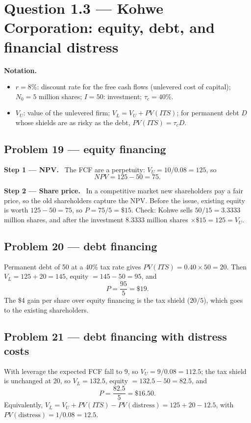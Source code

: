 \documentclass[11pt,a4paper]{article}
\numberwithin{equation}{section}
\newcommand{\statement}[1]{\par\smallskip\noindent\colorbox{black!5}{\parbox{\dimexpr\linewidth-2\fboxsep}{\small #1}}\par\medskip}
\newcommand{\step}[2]{\par\medskip\noindent\textbf{Step #1 --- #2.}~}
\newenvironment{notation}{\par\noindent\textbf{Notation.}\begin{itemize}[leftmargin=1.4em]}{\end{itemize}}
\begin{document}
\section{Question 1.3 --- Kohwe Corporation: equity, debt, and financial distress}

\statement{\QoneC}

\begin{notation}
  \item $r=8\%$: discount rate for the free cash flows (unlevered cost of capital); $N_0=5$ million
        shares; $I=50$: investment; $\tau_c=40\%$.
  \item $V_U$: value of the unlevered firm; $V_L=V_U+PV(ITS)$; for permanent debt $D$ whose shields are
        as risky as the debt, $PV(ITS)=\tau_c D$.
\end{notation}

\subsection*{Problem 19 --- equity financing}
\step{1}{NPV}
The FCF are a perpetuity: $V_U=10/0.08=125$, so
\[ NPV=125-50=75. \]
\step{2}{Share price}
In a competitive market new shareholders pay a fair price, so the old shareholders capture the NPV.
Before the issue, existing equity is worth $125-50=75$, so $P=75/5=\$15$. Check: Kohwe sells
$50/15=3.3333$ million shares, and after the investment $8.3333$ million shares $\times\$15=125=V_U$.

\subsection*{Problem 20 --- debt financing}
Permanent debt of 50 at a 40\% tax rate gives $PV(ITS)=0.40\times50=20$. Then $V_L=125+20=145$, equity
$=145-50=95$, and
\[ P=\frac{95}{5}=\$19 . \]
The \$4 gain per share over equity financing is the tax shield ($20/5$), which goes to the existing
shareholders.

\subsection*{Problem 21 --- debt financing with distress costs}
With leverage the expected FCF fall to 9, so $V_U=9/0.08=112.5$; the tax shield is unchanged at 20, so
$V_L=132.5$, equity $=132.5-50=82.5$, and
\[ P=\frac{82.5}{5}=\$16.50 . \]
Equivalently, $V_L=V_U+PV(ITS)-PV(\text{distress})=125+20-12.5$, with $PV(\text{distress})=1/0.08=12.5$.
\end{document}
